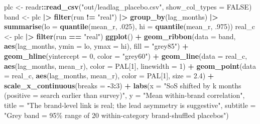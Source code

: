 \documentclass[
]{article}
\newenvironment{Shaded}{\begin{snugshade}}{\end{snugshade}}
\newcommand{\AttributeTok}[1]{\textcolor[rgb]{0.13,0.29,0.53}{#1}}
\newcommand{\ConstantTok}[1]{\textcolor[rgb]{0.56,0.35,0.01}{#1}}
\newcommand{\DecValTok}[1]{\textcolor[rgb]{0.00,0.00,0.81}{#1}}
\newcommand{\FloatTok}[1]{\textcolor[rgb]{0.00,0.00,0.81}{#1}}
\newcommand{\FunctionTok}[1]{\textcolor[rgb]{0.13,0.29,0.53}{\textbf{#1}}}
\newcommand{\NormalTok}[1]{#1}
\newcommand{\OtherTok}[1]{\textcolor[rgb]{0.56,0.35,0.01}{#1}}
\newcommand{\SpecialCharTok}[1]{\textcolor[rgb]{0.81,0.36,0.00}{\textbf{#1}}}
\newcommand{\StringTok}[1]{\textcolor[rgb]{0.31,0.60,0.02}{#1}}
\begin{document}
\begin{Shaded}
\begin{Highlighting}[]
\NormalTok{plc }\OtherTok{\textless{}{-}}\NormalTok{ readr}\SpecialCharTok{::}\FunctionTok{read\_csv}\NormalTok{(}\StringTok{"out/leadlag\_placebo.csv"}\NormalTok{, }\AttributeTok{show\_col\_types =} \ConstantTok{FALSE}\NormalTok{)}
\NormalTok{band }\OtherTok{\textless{}{-}}\NormalTok{ plc }\SpecialCharTok{|\textgreater{}} \FunctionTok{filter}\NormalTok{(run }\SpecialCharTok{!=} \StringTok{"real"}\NormalTok{) }\SpecialCharTok{|\textgreater{}} \FunctionTok{group\_by}\NormalTok{(lag\_months) }\SpecialCharTok{|\textgreater{}}
  \FunctionTok{summarise}\NormalTok{(}\AttributeTok{lo =} \FunctionTok{quantile}\NormalTok{(mean\_r, .}\DecValTok{025}\NormalTok{), }\AttributeTok{hi =} \FunctionTok{quantile}\NormalTok{(mean\_r, .}\DecValTok{975}\NormalTok{))}
\NormalTok{real\_c }\OtherTok{\textless{}{-}}\NormalTok{ plc }\SpecialCharTok{|\textgreater{}} \FunctionTok{filter}\NormalTok{(run }\SpecialCharTok{==} \StringTok{"real"}\NormalTok{)}
\FunctionTok{ggplot}\NormalTok{() }\SpecialCharTok{+}
  \FunctionTok{geom\_ribbon}\NormalTok{(}\AttributeTok{data =}\NormalTok{ band, }\FunctionTok{aes}\NormalTok{(lag\_months, }\AttributeTok{ymin =}\NormalTok{ lo, }\AttributeTok{ymax =}\NormalTok{ hi),}
              \AttributeTok{fill =} \StringTok{"grey85"}\NormalTok{) }\SpecialCharTok{+}
  \FunctionTok{geom\_hline}\NormalTok{(}\AttributeTok{yintercept =} \DecValTok{0}\NormalTok{, }\AttributeTok{color =} \StringTok{"grey60"}\NormalTok{) }\SpecialCharTok{+}
  \FunctionTok{geom\_line}\NormalTok{(}\AttributeTok{data =}\NormalTok{ real\_c, }\FunctionTok{aes}\NormalTok{(lag\_months, mean\_r), }\AttributeTok{color =}\NormalTok{ PAL[}\DecValTok{1}\NormalTok{], }\AttributeTok{linewidth =} \DecValTok{1}\NormalTok{) }\SpecialCharTok{+}
  \FunctionTok{geom\_point}\NormalTok{(}\AttributeTok{data =}\NormalTok{ real\_c, }\FunctionTok{aes}\NormalTok{(lag\_months, mean\_r), }\AttributeTok{color =}\NormalTok{ PAL[}\DecValTok{1}\NormalTok{], }\AttributeTok{size =} \FloatTok{2.4}\NormalTok{) }\SpecialCharTok{+}
  \FunctionTok{scale\_x\_continuous}\NormalTok{(}\AttributeTok{breaks =} \SpecialCharTok{{-}}\DecValTok{3}\SpecialCharTok{:}\DecValTok{3}\NormalTok{) }\SpecialCharTok{+}
  \FunctionTok{labs}\NormalTok{(}\AttributeTok{x =} \StringTok{"SoS shifted by k months (positive = search earlier than survey)"}\NormalTok{,}
       \AttributeTok{y =} \StringTok{"Mean within{-}brand correlation"}\NormalTok{,}
       \AttributeTok{title =} \StringTok{"The brand{-}level link is real; the lead asymmetry is suggestive"}\NormalTok{,}
       \AttributeTok{subtitle =} \StringTok{"Grey band = 95\% range of 20 within{-}category brand{-}shuffled placebos"}\NormalTok{)}
\end{Highlighting}
\end{Shaded}
\end{document}
